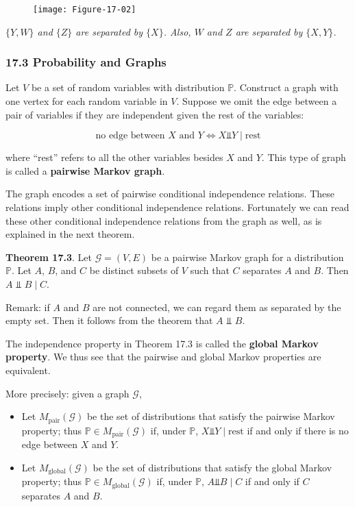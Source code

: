 \begin{figure}[H]
\texttt{[image: Figure-17-02]}
\end{figure}

\emph{\(\{Y, W\}\) and \(\{Z\}\) are separated by \(\{X\}\). Also, \(W\)
and \(Z\) are separated by \(\{X, Y\}\).}

\subsubsection{17.3 Probability and Graphs}\label{probability-and-graphs}

Let \(V\) be a set of random variables with distribution \(\mathbb{P}\).
Construct a graph with one vertex for each random variable in \(V\).
Suppose we omit the edge between a pair of variables if they are
independent given the rest of the variables:

\[ \text{no edge between } X \text{ and } Y \Leftrightarrow X \text{⫫} Y \;|\; \text{rest} \]

where ``rest'' refers to all the other variables besides \(X\) and
\(Y\). This type of graph is called a \textbf{pairwise Markov graph}.

The graph encodes a set of pairwise conditional independence relations.
These relations imply other conditional independence relations.
Fortunately we can read these other conditional independence relations
from the graph as well, as is explained in the next theorem.

\textbf{Theorem 17.3}. Let \(\mathcal{G} = (V, E)\) be a pairwise Markov
graph for a distribution \(\mathbb{P}\). Let \(A\), \(B\), and \(C\) be
distinct subsets of \(V\) such that \(C\) separates \(A\) and \(B\).
Then \(A \text{ ⫫ } B \;|\; C\).

Remark: if \(A\) and \(B\) are not connected, we can regard them as
separated by the empty set. Then it follows from the theorem that
\(A \text{ ⫫ } B\).

The independence property in Theorem 17.3 is called the \textbf{global
Markov property}. We thus see that the pairwise and global Markov
properties are equivalent.

More precisely: given a graph \(\mathcal{G}\),

\begin{itemize}[tightlist]
\item
  Let \(M_\text{pair}(\mathcal{G})\) be the set of distributions that
  satisfy the pairwise Markov property; thus
  \(\mathbb{P} \in M_\text{pair}(\mathcal{G})\) if, under
  \(\mathbb{P}\), \(X \text{⫫} Y \;|\; \text{rest}\) if and only if
  there is no edge between \(X\) and \(Y\).
\item
  Let \(M_\text{global}(\mathcal{G})\) be the set of distributions that
  satisfy the global Markov property; thus
  \(\mathbb{P} \in M_\text{global}(\mathcal{G})\) if, under
  \(\mathbb{P}\), \(A \text{⫫} B \;|\; C\) if and only if \(C\)
  separates \(A\) and \(B\).
\end{itemize}

